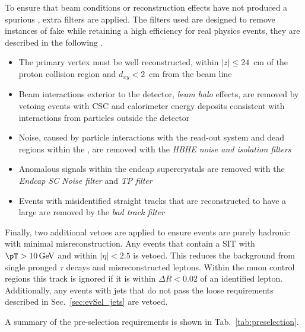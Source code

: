To ensure that beam conditions or reconstruction effects have
not produced a spurious \MET, extra filters are applied. The filters
used are designed to remove instances of fake \MET while retaining
a high efficiency for real physics events, they are described in the
following \cite{1748-0221-10-02-P02006}.
\begin{itemize}
\item{The primary vertex must be well reconstructed, within
$|z|\leq24$~cm of the proton collision region and $d_{xy}<2$~cm from the
beam line}
\item{Beam interactions exterior to the detector, \emph{beam halo} effects,
are removed by vetoing events with \ac{CSC} and calorimeter energy
deposits consistent with interactions from particles outside the
detector}
\item{Noise, caused by particle interactions with the read-out system
and dead regions within the \HCAL, are removed with the \emph{HBHE
noise and isolation filters}}
\item{Anomalous signals within the \ECAL endcap supercrystals are removed
with the \emph{\ECAL Endcap SC Noise filter} and \emph{\ECAL \ac{TP}
filter}}
\item{Events with misidentified straight tracks that are reconstructed
to have a large \pT are removed by the \emph{bad track filter}}
\end{itemize}

Finally, two additional vetoes are applied to ensure events are purely
hadronic with minimal misreconstruction. Any events that contain a
\ac{SIT} with $\pT > 10\gev$ and within $|\eta| < 2.5$ is vetoed. This
reduces the background from single pronged $\tau$ decays and
misreconstructed leptons. Within the muon control regions this track
is ignored if it is within $\Delta R <0.02$ of an identified lepton.
Additionally, any events with jets that do not pass the loose
requirements described in Sec.~\ref{sec:evSel_jets} are vetoed.

A summary of the pre-selection requirements is shown in
Tab.~\ref{tab:preselection}.


